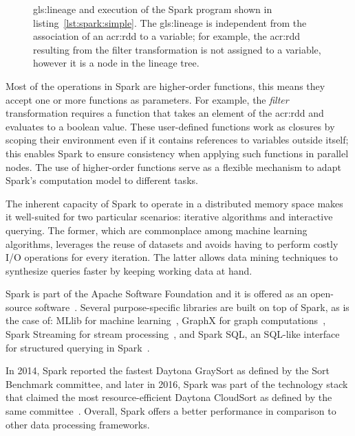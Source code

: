 \begin{figure}[t]
\caption[\Gls{gls:lineage} tree and execution of a Spark program]{\Gls{gls:lineage} and execution of the Spark program shown in listing~\ref{lst:spark:simple}. The \gls{gls:lineage} is independent from the association of an \acrshort{acr:rdd} to a variable; for example, the \acrshort{acr:rdd} resulting from the filter transformation is not assigned to a variable, however it is a node in the lineage tree.}
\end{figure}

Most of the operations in Spark are higher-order functions, this means they accept one or more functions as parameters. For example, the \textit{filter} transformation requires a function that takes an element of the \acrshort{acr:rdd} and evaluates to a boolean value. These user-defined functions work as closures by scoping their environment even if it contains references to variables outside itself; this enables Spark to ensure consistency when applying such functions in parallel nodes. The use of higher-order functions serve as a flexible mechanism to adapt Spark's computation model to different tasks.

The inherent capacity of Spark to operate in a distributed memory space makes it well-suited for two particular scenarios: iterative algorithms and interactive querying. The former, which are commonplace among machine learning algorithms, leverages the reuse of datasets and avoids having to perform costly I/O operations for every iteration. The latter allows data mining techniques to synthesize queries faster by keeping working data at hand.

Spark is part of the Apache Software Foundation and it is offered as an open-source software~\cite{WebApache2017,WebSpark2017}. Several purpose-specific libraries are built on top of Spark, as is the case of: MLlib for machine learning~\cite{Meng2016}, GraphX for graph computations~\cite{Xin2013}, Spark Streaming for stream processing~\cite{Zaharia2013}, and Spark SQL, an \mbox{SQL-like} interface for structured querying in Spark~\cite{Armbrust2015a}.

In 2014, Spark reported the fastest Daytona GraySort as defined by the Sort Benchmark committee, and later in 2016, Spark was part of the technology stack that claimed the most resource-efficient Daytona CloudSort as defined by the same committee~\cite{WebSortBenchmark2017,Xin2014,Wang}. Overall, Spark offers a better performance in comparison to other data processing frameworks.

